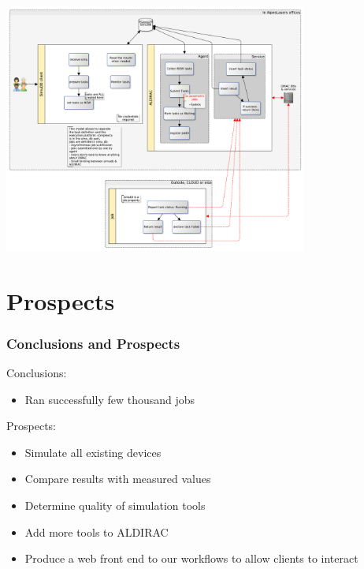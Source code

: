 \documentclass[14pt]{beamer}
\begin{document}
\begin{frame}
\vskip -1cm
\includegraphics[height=8.2cm]{dirac_arch}
\end{frame}

\section{Prospects}
\begin{frame}
\frametitle{Conclusions and Prospects}
Conclusions:
\begin{itemize}
\item Ran successfully few thousand jobs
\end{itemize}
Prospects:
\begin{itemize}
\item Simulate all existing devices
\item Compare results with measured values
\item Determine quality of simulation tools
\item Add more tools to ALDIRAC
\item Produce a web front end to our workflows to allow clients to interact
\end{itemize}
\end{frame}

\end{document}
